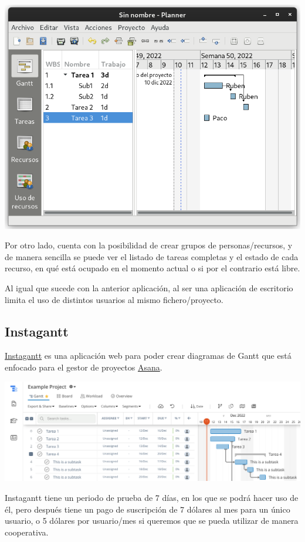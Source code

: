 \documentclass{\ClassPath/viu-tfm-template}
\begin{document}
\begin{center}
    \includegraphics[width=0.7\linewidth]{img/planner.png}
\end{center}

Por otro lado, cuenta con la posibilidad de crear grupos de personas/recursos, y de manera sencilla se puede ver el listado de tareas completas y el estado de cada recurso, en qué está ocupado en el momento actual o si por el contrario está libre.

Al igual que sucede con la anterior aplicación, al ser una aplicación de escritorio limita el uso de distintos usuarios al mismo fichero/proyecto.


\subsection{Instagantt}
\href{https://instagantt.com/}{Instagantt} es una aplicación web para poder crear diagramas de Gantt que está enfocado para el gestor de proyectos \href{https://asana.com/es}{Asana}.


\begin{center}
    \includegraphics[frame,width=0.8\linewidth]{img/instagantt.png}
\end{center}

Instagantt tiene un periodo de prueba de 7 días, en los que se podrá hacer uso de él, pero después tiene un pago de suscripción de 7 dólares al mes para un único usuario, o 5 dólares por usuario/mes si queremos que se pueda utilizar de manera cooperativa.
\end{document}
